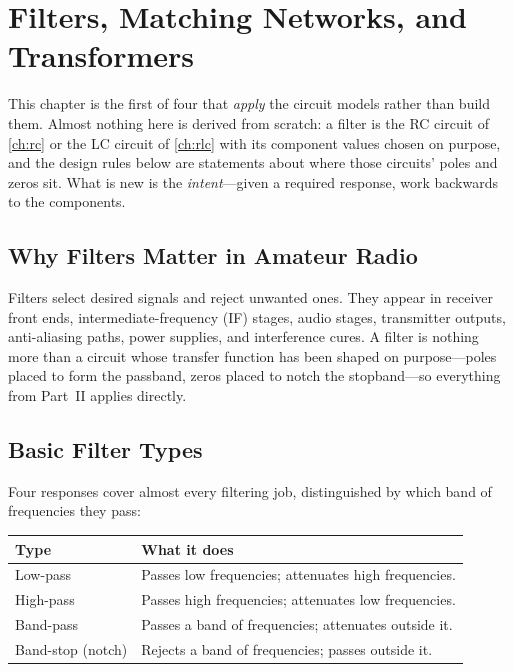 \chapter{Filters, Matching Networks, and Transformers}
\label{ch:filters}
This chapter is the first of four that \emph{apply} the circuit models rather than
build them. Almost nothing here is derived from scratch: a filter is the RC circuit
of \cref{ch:rc} or the LC circuit of \cref{ch:rlc} with its component values chosen on
purpose, and the design rules below are statements about where those circuits' poles
and zeros sit. What is new is the \emph{intent}---given a required response, work
backwards to the components.

\section{Why Filters Matter in Amateur Radio}
Filters select desired signals and reject unwanted ones. They appear in receiver
front ends, intermediate-frequency (IF) stages, audio stages, transmitter
outputs, anti-aliasing paths,
power supplies, and interference cures. A filter is nothing more than a circuit
whose transfer function has been shaped on purpose---poles placed to form the
passband, zeros placed to notch the stopband---so everything from Part~II applies
directly.

\section{Basic Filter Types}
Four responses cover almost every filtering job, distinguished by which band of
frequencies they pass:

\begin{center}
\begin{tabularx}{\textwidth}{@{}L{0.26\textwidth}Y@{}}
\toprule
Type & What it does \\
\midrule
Low-pass & Passes low frequencies; attenuates high frequencies. \\
High-pass & Passes high frequencies; attenuates low frequencies. \\
Band-pass & Passes a band of frequencies; attenuates outside it. \\
Band-stop (notch) & Rejects a band of frequencies; passes outside it. \\
\bottomrule
\end{tabularx}
\end{center}

